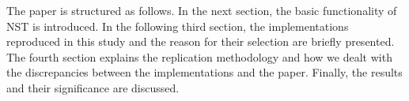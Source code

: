 The paper is structured as follows. In the next section, the basic functionality of \gls{NST} is introduced. In the following third section, the implementations reproduced in this study and the reason for their selection are briefly presented. The fourth section explains the replication methodology and how we dealt with the discrepancies between the implementations and the paper. Finally, the results and their significance are discussed.
